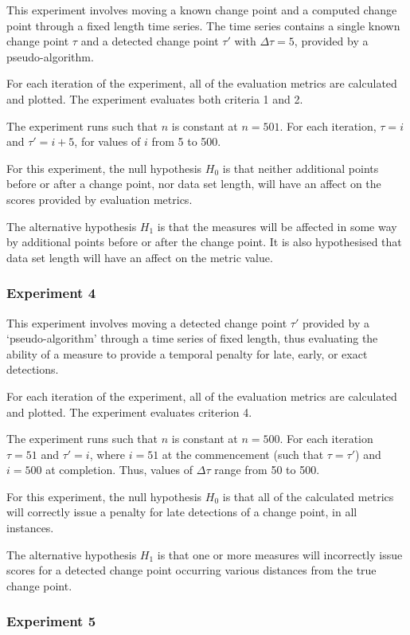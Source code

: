\documentclass[../main.tex]{subfiles}
\begin{document}
This experiment involves moving a known change point and a computed change point through a fixed length time series. The time series contains a single known change point $\tau$ and a detected change point $\tau'$ with $\Delta \tau = 5$, provided by a pseudo-algorithm.

For each iteration of the experiment, all of the evaluation metrics are calculated and plotted. The experiment evaluates both criteria 1 and 2.

The experiment runs such that $n$ is constant at $n=501$. For each iteration, $\tau = i$ and $\tau' = i + 5$, for values of $i$ from 5 to 500.

For this experiment, the null hypothesis $H_0$ is that neither additional points before or after a change point, nor data set length, will have an affect on the scores provided by evaluation metrics.

The alternative hypothesis $H_1$ is that the measures will be affected in some way by additional points before or after the change point. It is also hypothesised that data set length will have an affect on the metric value.

\subsubsection{Experiment 4}

This experiment involves moving a detected change point $\tau'$ provided by a `pseudo-algorithm' through a time series of fixed length, thus evaluating the ability of a measure to provide a temporal penalty for late, early, or exact detections.

For each iteration of the experiment, all of the evaluation metrics are calculated and plotted. The experiment evaluates criterion 4.

The experiment runs such that $n$ is constant at $n=500$. For each iteration $\tau = 51$ and $\tau' = i$, where $i = 51$ at the commencement (such that $\tau = \tau'$) and $i = 500$ at completion. Thus, values of $\Delta \tau$ range from 50 to 500.

For this experiment, the null hypothesis $H_0$ is that all of the calculated metrics will correctly issue a penalty for late detections of a change point, in all instances.

The alternative hypothesis $H_1$ is that one or more measures will incorrectly issue scores for a detected change point occurring various distances from the true change point.

\subsubsection{Experiment 5}
\end{document}

